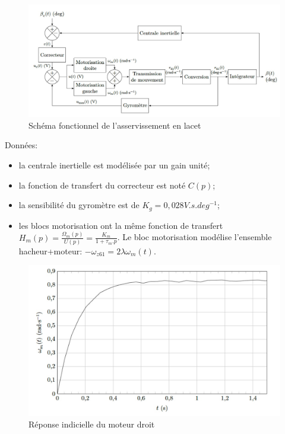 \begin{figure}[!ht]\begin{center}
 \includegraphics[width=\linewidth]{img/figure_15}
 \caption{Schéma fonctionnel de l’asservissement en lacet}
 \label{fig15}
\end{center}\end{figure}

\newpage

Données:
\begin{itemize}
 \item la centrale inertielle est modélisée par un gain unité;
 \item la fonction de transfert du correcteur est noté $C(p)$;
 \item la sensibilité du gyromètre est de $K_g=0,028V.s.deg^{-1}$;
 \item les blocs motorisation ont la même fonction de transfert $H_m(p)=\frac{\Omega_m(p)}{U(p)}=\frac{K_m}{1+\tau_m.p}$. Le bloc motorisation modélise l’ensemble hacheur+moteur: $-\omega_{z61}=2\lambda\omega_m(t)$.
\end{itemize}

\begin{figure}[!ht]\begin{center}
 \includegraphics[width=0.8\linewidth]{img/figure_16}
 \caption{Réponse indicielle du moteur droit}
 \label{fig16}
\end{center}\end{figure}

